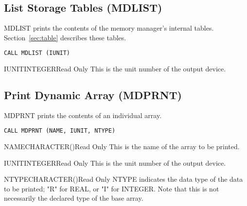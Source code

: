 \subsection{List Storage Tables (MDLIST)}
MDLIST prints the contents of the memory manager's internal tables.
Section~\ref{sec:table} describes these tables.

\verb+CALL MDLIST (IUNIT)+

\begin{argy}{IUNIT}{INTEGER}{Read Only}
This is the unit number of the output device.
\end{argy}

\subsection{Print Dynamic Array (MDPRNT)}
MDPRNT prints the contents of an individual array.

\verb+CALL MDPRNT (NAME, IUNIT, NTYPE)+

\begin{argy}{NAME}{CHARACTER\last(\last)}{Read Only}
This is the name of the array to be printed.
\end{argy}

\begin{argy}{IUNIT}{INTEGER}{Read Only}
This is the unit number of the output device.
\end{argy}

\begin{argy}{NTYPE}{CHARACTER\last(\last)}{Read Only}
NTYPE indicates the data type of the data to be printed; "R" for REAL, or
"I" for INTEGER.  Note that this is not necessarily the declared type of the
base array.
\end{argy}
